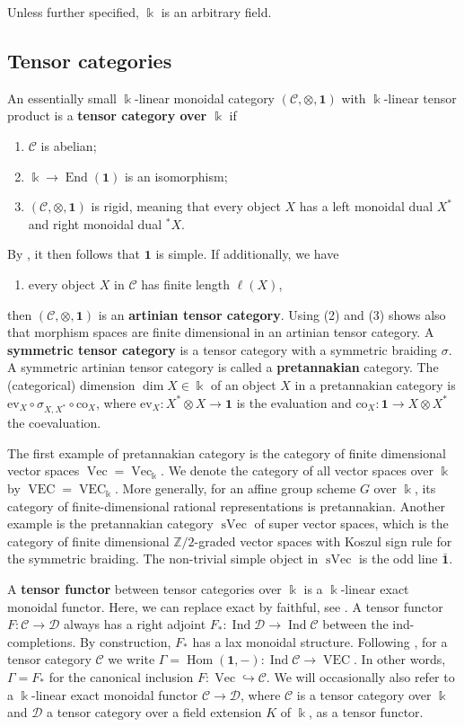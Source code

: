 \documentclass[11pt]{amsart}
\def\End{\operatorname{End}}
\def\dim{\operatorname{dim}}
\def\Ind{\operatorname{Ind}}
\def\Hom{\operatorname{Hom}}
\def\Cs{\mathscr{C}}
\def\Ds{\mathscr{D}}
\def\cC{\mathscr{C}}
\def\bk{\Bbbk}
\def\mZ{\mathbb{Z}}
\def\Vec{\operatorname{Vec}}
\def\VEC{\operatorname{VEC}}
\def\sVec{\operatorname{sVec}}
\theoremstyle{definition}
\theoremstyle{remark}
\numberwithin{equation}{section}
\newcommand{\unit}{\mathbf{1}}
\newcommand{\ev}{\mathrm{ev}}
\begin{document}
Unless further specified, $\bk$ is an arbitrary field.

\subsection{Tensor categories}\label{prel:tc}

An essentially small $\bk$-linear monoidal category $(\cC,\otimes,\unit)$ with $\bk$-linear tensor product is a {\bf tensor category over $\bk$} if
\begin{enumerate}
\item $\cC$ is abelian;
\item $\bk\to\End(\unit)$ is an isomorphism;
\item $(\cC,\otimes,\unit)$ is rigid, meaning that every object $X$ has a left monoidal dual $X^\ast$ and right monoidal dual ${}^\ast X$.
\end{enumerate}
By \cite[Proposition~1.17]{DM}, it then follows that $\unit$ is simple. If additionally, we have
\begin{enumerate}
\item[(4)] every object $X$ in $\cC$ has finite length $\ell(X)$,
\end{enumerate}
then $(\cC,\otimes,\unit)$ is an {\bf artinian tensor category}.
Using (2) and (3) shows also that morphism spaces are finite dimensional in an artinian tensor category. A {\bf symmetric tensor category} is a tensor category with a symmetric braiding $\sigma$. A symmetric artinian tensor category is called a {\bf pretannakian} category. The (categorical) dimension $\dim X\in\bk$ of an object $X$ in a pretannakian category is $\ev_X\circ \sigma_{X,X^\ast}\circ\mathrm{co}_X$, where $\ev_X:X^\ast\otimes X\to\unit$ is the evaluation and $\mathrm{co}_X:\unit\to X\otimes X^\ast$ the coevaluation.


The first example of pretannakian category is the category of finite dimensional vector spaces $\Vec=\Vec_{\bk}$. We denote the category of all vector spaces over $\bk$ by $\VEC=\VEC_{\bk}$. More generally, for an affine group scheme $G$ over $\bk$, its category of finite-dimensional rational representations is pretannakian.  Another example is  the pretannakian category $\sVec$ of super vector spaces, which is the category of finite dimensional $\mZ/2$-graded vector spaces with Koszul sign rule for the symmetric braiding. The non-trivial simple object in $\sVec$ is the odd line $\bar{\unit}$.


A {\bf tensor functor} between tensor categories over $\bk$ is a $\bk$-linear exact monoidal functor. Here, we can replace exact by faithful, see \cite[Theorem~2.4.1]{CEOP}. A tensor functor $F:\cC\to\Ds$ always has a right adjoint $F_\ast:\Ind\Ds\to\Ind\cC$ between the ind-completions. By construction, $F_\ast$ has a lax monoidal structure.
Following \cite{Del90}, for a tensor category $\cC$ we write $\Gamma=\Hom(\unit,-):\Ind\cC\to\VEC$. In other words, $\Gamma=F_\ast$ for the canonical inclusion $F:\Vec\hookrightarrow\cC$. We will occasionally also refer to a $\bk$-linear exact monoidal functor $\Cs\to\Ds$, where
$\Cs$ is a tensor category over $\bk$ and $\Ds$ a tensor category over a field extension $K$ of $\bk$, as a tensor functor.
\end{document}
